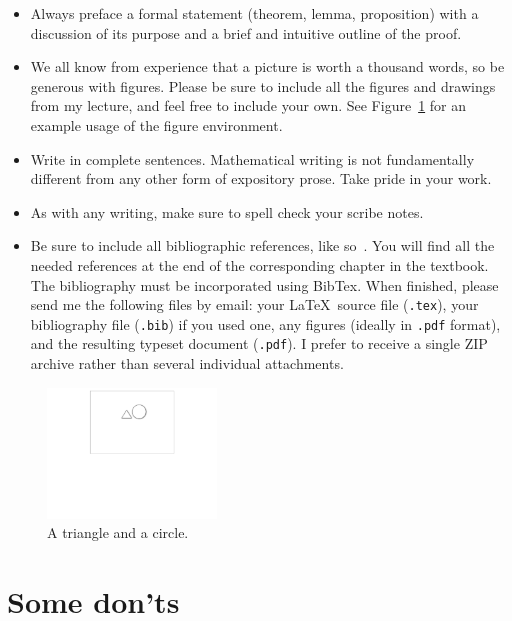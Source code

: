 \documentclass[usletter]{article}
\begin{document}
\begin{itemize}
\item Always preface a formal statement (theorem,
lemma, proposition) with a discussion of its purpose
and a brief and intuitive outline of the proof.

\item We all know from experience that a picture is
worth a thousand words, so be generous with figures.
Please be sure to include all the figures and drawings
from my lecture, and feel free to include your own. See
Figure~\ref{fig:triangle-circle} for an example usage
of the figure environment.

\item Write in complete sentences.  Mathematical
writing is not fundamentally different from any other
form of expository prose. Take pride in your work.

\item As with any writing, make sure to spell check
your scribe notes.

\item Be sure to include all bibliographic references,
like so~\cite{textbook}. You will find all the needed
references at the end of the corresponding chapter in the
textbook. The bibliography must be incorporated using
BibTex.  When finished, please send me the following
files by email: your \LaTeX\ source file ({\tt .tex}),
your bibliography file ({\tt .bib}) if you used one,
any figures (ideally in {\tt .pdf} format), and the
resulting typeset document ({\tt .pdf}).   I prefer to
receive a single ZIP archive rather than several
individual attachments.
\end{itemize}

\begin{figure}
\begin{center}
\includegraphics[width=0.4\textwidth]{triangle-circle}
\end{center}
\caption{A triangle and a circle.}
\label{fig:triangle-circle}
\end{figure}

\section{Some don'ts}
\end{document}
